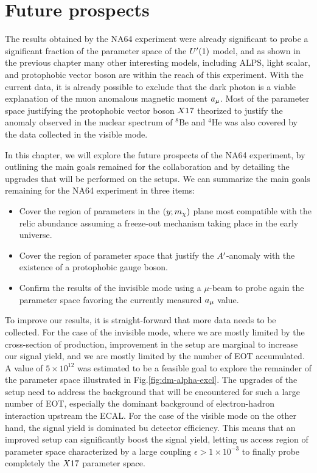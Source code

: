 
\newcommand{\pdirfive}{chapters/plots/chapter5}

\chapter{Future prospects} %
\label{chapter5} %

The results obtained by the NA64 experiment were already significant to probe a significant fraction of the parameter space of the $U'(1)$ model, and as shown in the previous chapter many other interesting models, including ALPS, light scalar, and protophobic vector boson are within the reach of this experiment. With the current data, it is already possible to exclude that the dark photon is a viable explanation of the muon anomalous magnetic moment $a_{\mu}$. Most of the parameter space justifying the protophobic vector boson $X17$ theorized to justify the anomaly observed in the nuclear spectrum of $^8$Be and $^4$He was also covered by the data collected in the visible mode.

In this chapter, we will explore the future prospects of the NA64 experiment, by outlining the main goals remained for the collaboration and by detailing the upgrades that will be performed on the setups. We can summarize the main goals remaining for the NA64 experiment in three items:

\begin{itemize}
\item Cover the region of parameters in the $(y;m_{\chi})$ plane most compatible with the relic abundance assuming a freeze-out mechanism taking place in the early universe.
\item Cover the region of parameter space that justify the $A'$-anomaly with the existence of a protophobic gauge boson.  
\item Confirm the results of the invisible mode using a $\mu$-beam to probe again the parameter space favoring the currently measured $a_{\mu}$ value.
\end{itemize}

To improve our results, it is straight-forward that more data needs to be collected. For the case of the invisible mode, where we are mostly limited by the cross-section of production, improvement in the setup are marginal to increase our signal yield, and we are mostly limited by the number of EOT accumulated. A value of $5 \times 10^{12}$ was estimated to be a feasible goal to explore the remainder of the parameter space illustrated in Fig.\ref{fig:dm-alpha-excl}. The upgrades of the setup need to address the background that will be encountered for such a large number of EOT, especially the dominant background of electron-hadron interaction upstream the ECAL.
For the case of the visible mode on the other hand, the signal yield is dominated bu detector efficiency. This means that an improved setup can significantly boost the signal yield, letting us access region of parameter space characterized by a large coupling $\epsilon > 1 \times 10^{-3}$ to finally probe completely the $X17$ parameter space.

